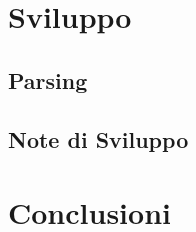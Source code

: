 \documentclass{article}
\begin{document}
  \section{Sviluppo}
  \subsection{Parsing}
  \subsection{Note di Sviluppo}
  \section{Conclusioni}
\end{document}
